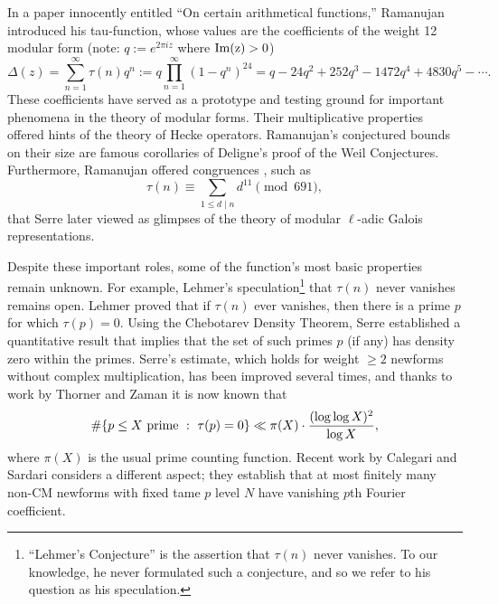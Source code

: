 \documentclass[12pt]{amsart}
\newcommand{\im}{\rm {Im}}
\newcommand{\?}{\color{red}?}
\numberwithin{equation}{section}
\begin{document}
In a paper innocently entitled ``On certain arithmetical functions,'' Ramanujan introduced his tau-function, whose values are the coefficients of the
weight 12 modular form (note: $q:=e^{2\pi i z}$ where $\im(z)>0$)
\begin{equation}
\Delta(z)=\sum_{n=1}^{\infty}\tau(n)q^n:=q\prod_{n=1}^{\infty}(1-q^n)^{24}=q-24q^2+252q^3-1472q^4+4830q^5-\cdots.
\end{equation}
These coefficients have served as a prototype and testing ground for important phenomena in the theory of modular forms.
Their multiplicative properties offered hints of the theory of Hecke operators. Ramanujan's conjectured bounds on their size are famous corollaries of
Deligne's proof of the Weil Conjectures. Furthermore, Ramanujan offered congruences \cite{RamanujanUnpublished, Ramanujan, SerreRamanujan}, such as
\begin{equation}\label{Cong691}
\tau(n)\equiv \sum_{1\leq d\mid n}d^{11}\pmod{691},
\end{equation}
that Serre  \cite{SerreRamanujan} later viewed as glimpses of the theory of modular $\ell$-adic Galois representations.

Despite these important roles, some of the function's most basic properties remain unknown. For example, Lehmer's speculation\footnote{``Lehmer's Conjecture'' is the assertion that $\tau(n)$ never vanishes. To our knowledge, he never formulated such a conjecture, and so we refer to his question as his speculation.}  that $\tau(n)$ never vanishes remains open. Lehmer proved \cite{Lehmer} that if $\tau(n)$ ever vanishes, then there is a prime $p$ for which $\tau(p)=0.$  Using the Chebotarev Density Theorem, Serre \cite{SerreCheb}  established a quantitative result that implies that the set of such primes $p$ (if any)
 has density zero within the primes. Serre's estimate, which holds for weight $\geq 2$ newforms without complex multiplication,  has been improved several times, and  thanks to work by Thorner and Zaman \cite{ThornerZaman} it is now known that
 $$
 \# \{ p\leq	X \ {\text {\rm prime}}\ : \ \tau(p)=0\} \ll \pi(X)\cdot \frac{(\log \log X)^2}{\log X},
 $$
 where $\pi(X)$ is the usual prime counting function.
 Recent work by Calegari and Sardari \cite{CalegariSardari} considers a different aspect; they establish that
 at most finitely many non-CM newforms with fixed tame $p$ level $N$ have vanishing $p$th Fourier coefficient.
 
\end{document}
